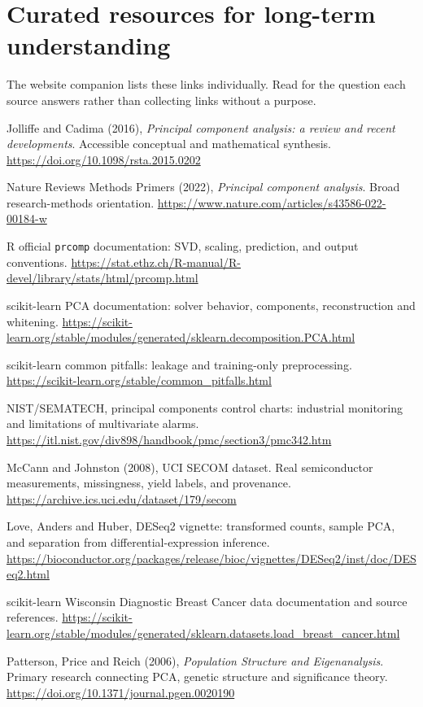 \documentclass[11pt]{article}
\begin{document}
\section{Curated resources for long-term understanding}
The website companion lists these links individually. Read for the question each source answers rather than collecting links without a purpose.
\begin{enumerate}[label={[\arabic*]}]
\item\label{ref:review} Jolliffe and Cadima (2016), \emph{Principal component analysis: a review and recent developments}. Accessible conceptual and mathematical synthesis. \url{https://doi.org/10.1098/rsta.2015.0202}
\item Nature Reviews Methods Primers (2022), \emph{Principal component analysis}. Broad research-methods orientation. \url{https://www.nature.com/articles/s43586-022-00184-w}
\item\label{ref:r} R official \texttt{prcomp} documentation: SVD, scaling, prediction, and output conventions. \url{https://stat.ethz.ch/R-manual/R-devel/library/stats/html/prcomp.html}
\item\label{ref:sklearn} scikit-learn PCA documentation: solver behavior, components, reconstruction and whitening. \url{https://scikit-learn.org/stable/modules/generated/sklearn.decomposition.PCA.html}
\item\label{ref:leakage} scikit-learn common pitfalls: leakage and training-only preprocessing. \url{https://scikit-learn.org/stable/common_pitfalls.html}
\item\label{ref:nist} NIST/SEMATECH, principal components control charts: industrial monitoring and limitations of multivariate alarms. \url{https://itl.nist.gov/div898/handbook/pmc/section3/pmc342.htm}
\item\label{ref:secom} McCann and Johnston (2008), UCI SECOM dataset. Real semiconductor measurements, missingness, yield labels, and provenance. \url{https://archive.ics.uci.edu/dataset/179/secom}
\item\label{ref:deseq} Love, Anders and Huber, DESeq2 vignette: transformed counts, sample PCA, and separation from differential-expression inference. \url{https://bioconductor.org/packages/release/bioc/vignettes/DESeq2/inst/doc/DESeq2.html}
\item\label{ref:data} scikit-learn Wisconsin Diagnostic Breast Cancer data documentation and source references. \url{https://scikit-learn.org/stable/modules/generated/sklearn.datasets.load_breast_cancer.html}
\item Patterson, Price and Reich (2006), \emph{Population Structure and Eigenanalysis}. Primary research connecting PCA, genetic structure and significance theory. \url{https://doi.org/10.1371/journal.pgen.0020190}

\end{enumerate}
\end{document}
